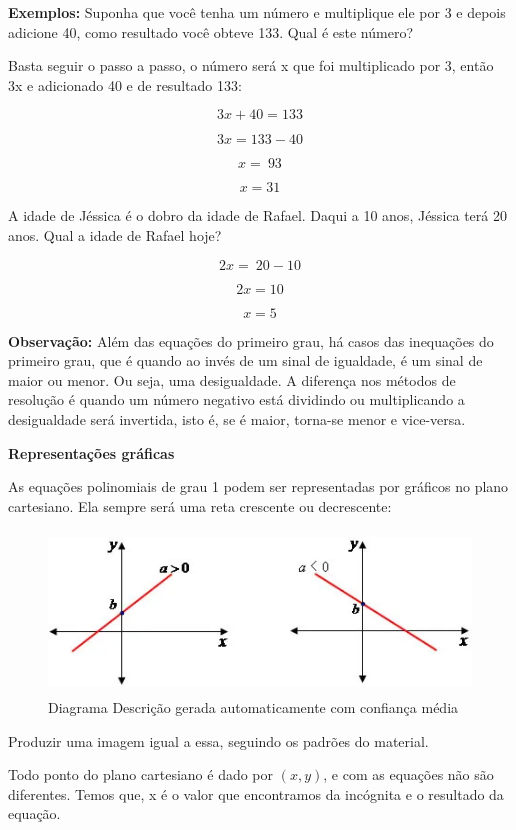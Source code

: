\textbf{Exemplos:} Suponha que você tenha um número e multiplique ele
por 3 e depois adicione 40, como resultado você obteve 133. Qual é este
número?

Basta seguir o passo a passo, o número será x que foi multiplicado por
3, então 3x e adicionado 40 e de resultado 133:

$$3x + 40 = 133$$

$$3x = 133 - 40$$

$$x = \ 93$$

$$x = 31$$

A idade de Jéssica é o dobro da idade de Rafael. Daqui a 10 anos,
Jéssica terá 20 anos. Qual a idade de Rafael hoje?

$$2x = \ 20 - 10$$

$$2x = 10$$

$$x = 5$$

\textbf{Observação:} Além das equações do primeiro grau, há casos das
inequações do primeiro grau, que é quando ao invés de um sinal de
igualdade, é um sinal de maior ou menor. Ou seja, uma desigualdade. A
diferença nos métodos de resolução é quando um número negativo está
dividindo ou multiplicando a desigualdade será invertida, isto é, se é
maior, torna-se menor e vice-versa.

\textbf{Representações gráficas}

As equações polinomiais de grau 1 podem ser representadas por gráficos
no plano cartesiano. Ela sempre será uma reta crescente ou decrescente:

\begin{figure}
\centering
\includegraphics[width=4.82292in,height=1.69792in]{./imgSAEB_7_MAT/media/image17.png}
\caption{Diagrama Descrição gerada automaticamente com confiança média}
\end{figure}

Produzir uma imagem igual a essa, seguindo os padrões do material.

Todo ponto do plano cartesiano é dado por \((x,y)\), e com as equações
não são diferentes. Temos que, x é o valor que encontramos da incógnita
e o resultado da equação.

